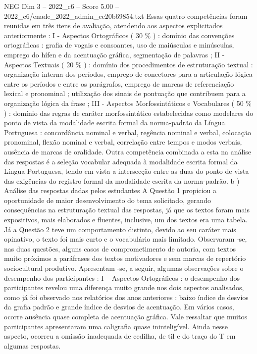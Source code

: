 \begin{textsample}{NEG Dim 3 – 2022\_c6 – Score 5.00 – 2022\_c6/enade\_2022\_admin\_cc20b69854.txt}
Essas quatro competências foram reunidas em três itens de avaliação, atendendo aos aspectos explicitados anteriormente : I - Aspectos Ortográficos ( 30 \% ) : domínio das convenções ortográficas : grafia de vogais e consoantes, uso de maiúsculas e minúsculas, emprego do hífen e da acentuação gráfica, segmentação de palavras ; II - Aspectos Textuais ( 20 \% ) : domínio dos procedimentos de estruturação textual : organização interna dos períodos, emprego de conectores para a articulação lógica entre os períodos e entre os parágrafos, emprego de marcas de referenciação lexical e pronominal ; utilização dos sinais de pontuação que contribuem para a organização lógica da frase ; III - Aspectos Morfossintáticos e Vocabulares ( 50 \% ) : domínio das regras de caráter morfossintático estabelecidas como modelares do ponto de vista da modalidade escrita formal da norma-padrão da Língua Portuguesa : concordância nominal e verbal, regência nominal e verbal, colocação pronominal, flexão nominal e verbal, correlação entre tempos e modos verbais, ausência de marcas de oralidade.
Outra competência combinada a esta na análise das respostas é a seleção vocabular adequada à modalidade escrita formal da Língua Portuguesa, tendo em vista a intersecção entre as duas do ponto de vista das exigências do registro formal da modalidade escrita da norma-padrão. b ) Análise das respostas dadas pelos estudantes A Questão 1 propiciou a oportunidade de maior desenvolvimento do tema solicitado, gerando consequências na estruturação textual das respostas, já que os textos foram mais expositivos, mais elaborados e fluentes, inclusive, um dos textos era uma tabela.
Já a Questão 2 teve um comportamento distinto, devido ao seu caráter mais opinativo, o texto foi mais curto e o vocabulário mais limitado.
Observaram -se, nas duas questões, alguns casos de comprometimento de autoria, com textos muito próximos a paráfrases dos textos motivadores e sem marcas de repertório sociocultural produtivo.
Apresentam -se, a seguir, algumas observações sobre o desempenho dos participantes : I – Aspectos Ortográficos : o desempenho dos participantes revelou uma diferença muito grande nos dois aspectos analisados, como já foi observado nos relatórios dos anos anteriores : baixo índice de desvios da grafia padrão e grande índice de desvios de acentuação.
Em vários casos, ocorre ausência quase completa de acentuação gráfica.
Vale ressaltar que muitos participantes apresentaram uma caligrafia quase ininteligível.
Ainda nesse aspecto, ocorreu a omissão inadequada de cedilha, de til e do traço do T em algumas respostas.

\end{textsample}
